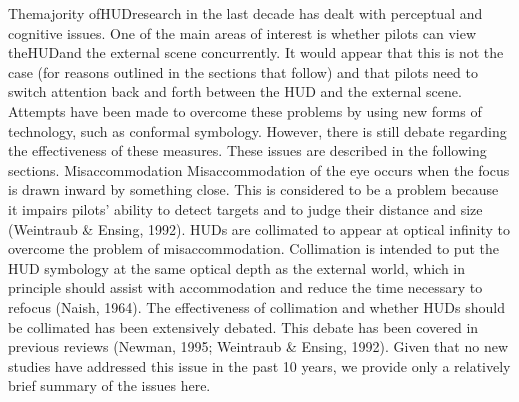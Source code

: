\documentclass[utf8,bachelor,manualbib]{gradu3}
\begin{document}
Themajority ofHUDresearch in the last decade has dealt with perceptual and cognitive
issues. One of the main areas of interest is whether pilots can view theHUDand
the external scene concurrently. It would appear that this is not the case (for reasons
outlined in the sections that follow) and that pilots need to switch attention back and
forth between the HUD and the external scene. Attempts have been made to overcome
these problems by using new forms of technology, such as conformal
symbology. However, there is still debate regarding the effectiveness of these measures.
These issues are described in the following sections.
Misaccommodation
Misaccommodation of the eye occurs when the focus is drawn inward by something
close. This is considered to be a problem because it impairs pilots’ ability
to detect targets and to judge their distance and size (Weintraub \& Ensing,
1992). HUDs are collimated to appear at optical infinity to overcome the problem
of misaccommodation. Collimation is intended to put the HUD symbology
at the same optical depth as the external world, which in principle should assist
with accommodation and reduce the time necessary to refocus (Naish, 1964).
The effectiveness of collimation and whether HUDs should be collimated has
been extensively debated. This debate has been covered in previous reviews
(Newman, 1995; Weintraub \& Ensing, 1992). Given that no new studies have
addressed this issue in the past 10 years, we provide only a relatively brief summary
of the issues here.\citep{crawford2006}
\end{document}
